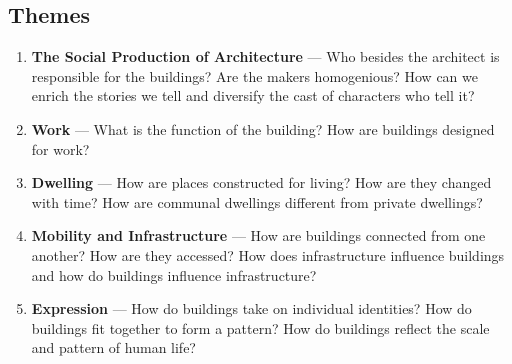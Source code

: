 \subsection*{Themes}

\begin{enumerate}
\item \textbf{The Social Production of Architecture} --- Who besides the architect is responsible for the buildings? Are the makers homogenious? How can we enrich the stories we tell and diversify the cast of characters who tell it?
\item \textbf{Work} --- What is the function of the building? How are buildings designed for work?
\item \textbf{Dwelling} --- How are places constructed for living? How are they changed with time? How are communal dwellings different from private dwellings?
\item \textbf{Mobility and Infrastructure} --- How are buildings connected from one another? How are they accessed? How does infrastructure influence buildings and how do buildings influence infrastructure?
\item \textbf{Expression} --- How do buildings take on individual identities? How do buildings fit together to form a pattern? How do buildings reflect the scale and pattern of human life?
\end{enumerate}